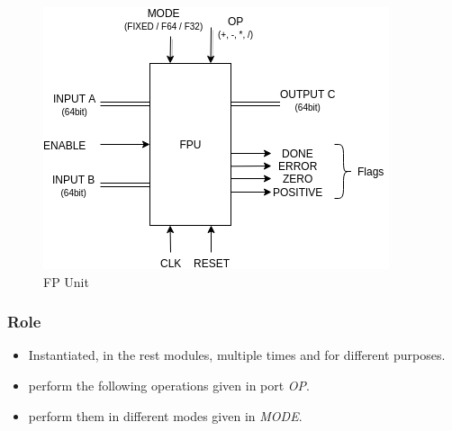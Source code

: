 \documentclass[12pt]{report}
\begin{document}
\begin{center}
    \begin{figure}[hp]
        \centering
        \includegraphics[width=\textwidth]{images/FPU}
        \caption{FP Unit}
        \label{fig:fpu}
    \end{figure}
\end{center}

\subsubsection{Role}
\begin{itemize}
    \item Instantiated, in the rest modules, multiple times and for different purposes.
    \item perform the following operations given in port \emph{OP}.
    \item perform them in different modes given in \emph{MODE}.
\end{itemize}
\end{document}
